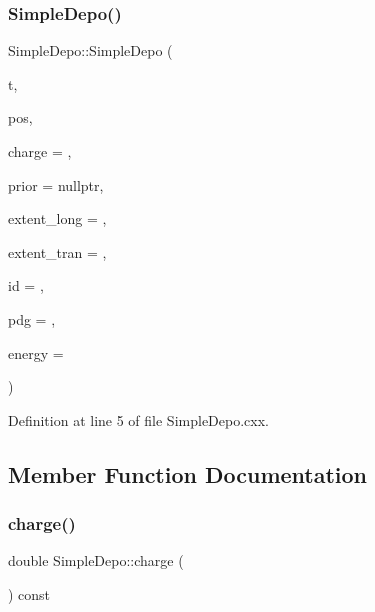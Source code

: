 \subsubsection{\texorpdfstring{Simple\+Depo()}{SimpleDepo()}}
{\footnotesize\ttfamily Simple\+Depo\+::\+Simple\+Depo (\begin{DoxyParamCaption}\item[{double}]{t,  }\item[{const \hyperlink{namespace_wire_cell_ab2b2565fa6432efbb4513c14c988cda9}{Wire\+Cell\+::\+Point} \&}]{pos,  }\item[{double}]{charge = {},  }\item[{\hyperlink{class_wire_cell_1_1_i_data_aff870b3ae8333cf9265941eef62498bc}{I\+Depo\+::pointer}}]{prior = {\ttfamily nullptr},  }\item[{double}]{extent\+\_\+long = {},  }\item[{double}]{extent\+\_\+tran = {},  }\item[{int}]{id = {},  }\item[{int}]{pdg = {},  }\item[{double}]{energy = {} }\end{DoxyParamCaption})}



Definition at line 5 of file Simple\+Depo.\+cxx.



\subsection{Member Function Documentation}
\mbox{\label{class_wire_cell_1_1_simple_depo_a07e9a03fcc18207e8e55ac3ed201828c}} 
\subsubsection{\texorpdfstring{charge()}{charge()}}
{\footnotesize\ttfamily double Simple\+Depo\+::charge (\begin{DoxyParamCaption}{ }\end{DoxyParamCaption}) const\hspace{0.3cm}{\ttfamily [virtual]}}



